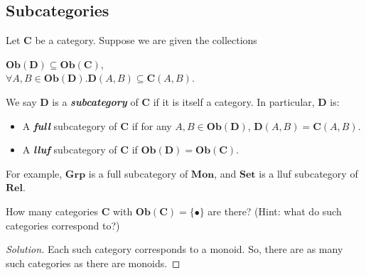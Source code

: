 \documentclass[]{amsbook}
\newcommand{\catname}[1]{\mathbf{#1}}
\newenvironment{solution}
    {\begin{proof}[Solution]}{\end{proof}}
\begin{document}
\subsection*{Subcategories}
Let $\catname{C}$ be a category. Suppose we are given the collections
\begin{center}
    $\mathbf{Ob}(\catname{D}) \subseteq \mathbf{Ob}(\catname{C})$,\\
    $\forall A, B \in \mathbf{Ob}(\catname{D}).
    \catname{D}(A, B) \subseteq \catname{C}(A, B)$.
\end{center}
We say $\catname{D}$ is a \emph{\textbf{subcategory}} of $\catname{C}$ if
it is itself a category. In particular, $\catname{D}$ is:
\begin{itemize}
    \item A \emph{\textbf{full}} subcategory of $\catname{C}$ if for any
    $A, B \in \mathbf{Ob}(\catname{D})$, $\catname{D}(A, B) = \catname{C}(A, B)$.
    \item  A \emph{\textbf{lluf}} subcategory of $\catname{C}$ if
    $\mathbf{Ob}(\catname{D}) = \mathbf{Ob}(\catname{C})$.
\end{itemize}
For example, $\catname{Grp}$ is a full subcategory of $\catname{Mon}$, and
$\catname{Set}$ is a lluf subcategory of $\catname{Rel}$.

\setcounter{Exercise}{15}
\begin{Exercise}
    How many categories $\catname{C}$ with $\mathbf{Ob}(\catname{C}) =
    \{ \bullet \}$ are there? (Hint: what do such categories correspond to?)
\end{Exercise}
\begin{solution}
    Each such category corresponds to a monoid. So, there are as many such
    categories as there are monoids.
\end{solution}
\end{document}
